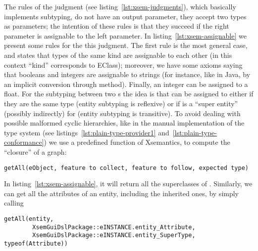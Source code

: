 The rules of the judgment  (see
listing~\ref{lst:xsem-judgments}), which basically implements subtyping, do not
have an output parameter, they accept two types as parameters; the intention of
these rules is that they succeed if the right parameter is assignable to the
left parameter.
In listing~\ref{lst:xsem-assignable} we present some rules for the this
judgment.  The first rule is the most general case, and states that types of the
same kind are assignable to each other (in this context ``kind'' corresponds to
EClass); moreover, we have some axioms saying that booleans and integers are
assignable to strings (for instance, like in Java, by an implicit conversion
through  method).  Finally, an integer can be assigned to a
float.
For the subtyping between two s the idea is that 
can be assigned to  either if they are the same type (entity
subtyping is reflexive) or if  is a ``super entity'' (possibly
indirectly) for  (entity subtyping is transitive).
To avoid dealing with possible malformed cyclic hierarchies, like in the manual
implementation of the type system (see listings~\ref{lst:plain-type-provider1}
and~\ref{lst:plain-type-conformance}) we use a predefined function of
Xsemantics, to compute the ``closure'' of a graph:

\begin{lstlisting}[language=xsemantics] 
getAll(eObject, feature to collect, feature to follow, expected type)
\end{lstlisting}

In listing~\ref{lst:xsem-assignable}, it will return all
the superclasses of .  Similarly, we can get all the attributes of
an entity, including the inherited ones, by simply calling

\begin{lstlisting}[language=xsemantics] 
getAll(entity, 
		XsemGuiDslPackage::eINSTANCE.entity_Attribute,
		XsemGuiDslPackage::eINSTANCE.entity_SuperType, typeof(Attribute))
\end{lstlisting}

% 

